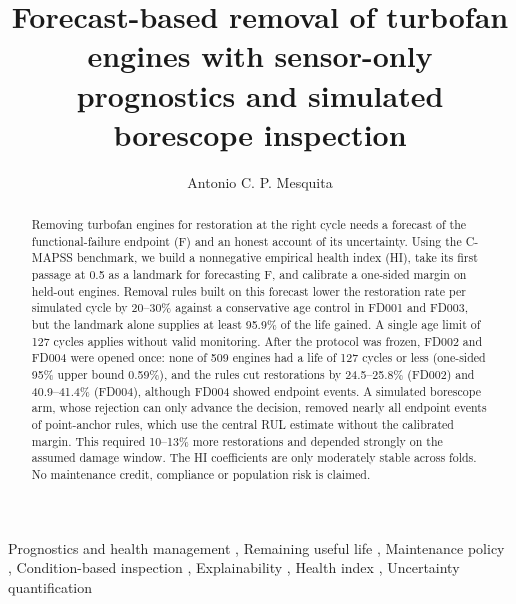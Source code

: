 \documentclass[preprint,12pt]{elsarticle}
\begin{document}
\begin{frontmatter}

\title{Forecast-based removal of turbofan engines with sensor-only prognostics and simulated borescope inspection}


\author[ita]{Antonio C. P. Mesquita}



\begin{abstract}
Removing turbofan engines for restoration at the right cycle needs a forecast of the functional-failure endpoint (F) and an honest account of its uncertainty. Using the C-MAPSS benchmark, we build a nonnegative empirical health index (HI), take its first passage at 0.5 as a landmark for forecasting F, and calibrate a one-sided margin on held-out engines. Removal rules built on this forecast lower the restoration rate per simulated cycle by 20--30\% against a conservative age control in FD001 and FD003, but the landmark alone supplies at least 95.9\% of the life gained. A single age limit of 127 cycles applies without valid monitoring. After the protocol was frozen, FD002 and FD004 were opened once: none of 509 engines had a life of 127 cycles or less (one-sided 95\% upper bound 0.59\%), and the rules cut restorations by 24.5--25.8\% (FD002) and 40.9--41.4\% (FD004), although FD004 showed endpoint events. A simulated borescope arm, whose rejection can only advance the decision, removed nearly all endpoint events of point-anchor rules, which use the central RUL estimate without the calibrated margin. This required 10--13\% more restorations and depended strongly on the assumed damage window. The HI coefficients are only moderately stable across folds. No maintenance credit, compliance or population risk is claimed.
\end{abstract}

\begin{keyword}
Prognostics and health management \sep
Remaining useful life \sep
Maintenance policy \sep
Condition-based inspection \sep
Explainability \sep
Health index \sep
Uncertainty quantification
\end{keyword}

\end{frontmatter}
\end{document}
